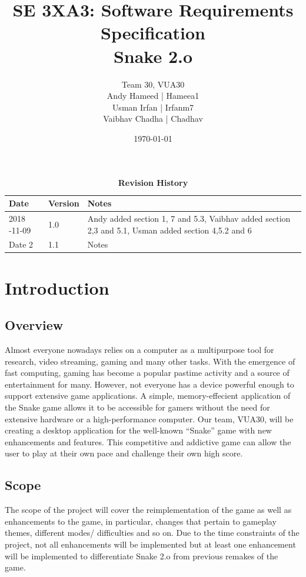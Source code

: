 \documentclass[12pt, titlepage]{article}
\title{SE 3XA3: Software Requirements Specification\\Snake 2.o}
\author{Team 30, VUA30
		\\ Andy Hameed | Hameea1
		\\ Usman Irfan | Irfanm7
		\\ Vaibhav Chadha | Chadhav
}
\date{\today}
\begin{document}
\maketitle

\tableofcontents
\listoftables
\listoffigures

\begin{table}[bp]
\caption{\bf Revision History}
\begin{tabularx}{\textwidth}{p{3cm}p{2cm}X}
\toprule {\bf Date} & {\bf Version} & {\bf Notes}\\
\midrule
2018 -11-09 & 1.0 & Andy added section 1, 7 and 5.3, Vaibhav added section 2,3 and 5.1, Usman added section 4,5.2 and 6\\
Date 2 & 1.1 & Notes\\
\bottomrule
\end{tabularx}
\end{table}

\newpage


\section{Introduction}

\subsection{Overview}
Almost everyone nowadays relies on a computer as a multipurpose tool for research, video streaming, gaming and many other tasks. With the emergence of fast computing, gaming has become a popular pastime activity and a source of entertainment for many. However, not everyone has a device powerful enough to support extensive game applications. A simple, memory-effecient application of the Snake game allows it to be accessible for gamers without the need for extensive hardware or a high-performance computer. Our team, VUA30, will be creating a desktop application for the well-known “Snake” game with new enhancements and features. This competitive and addictive game can allow the user to play at their own pace and challenge their own high score. 

\subsection{Scope}
The scope of the project will cover the reimplementation of the game as well as enhancements to the game, in particular, changes that pertain to gameplay themes, different modes/ difficulties and so on. Due to the time constraints of the project, not all enhancements will be implemented but at least one enhancement will be implemented to differentiate Snake 2.o from previous remakes of the game.
\end{document}

